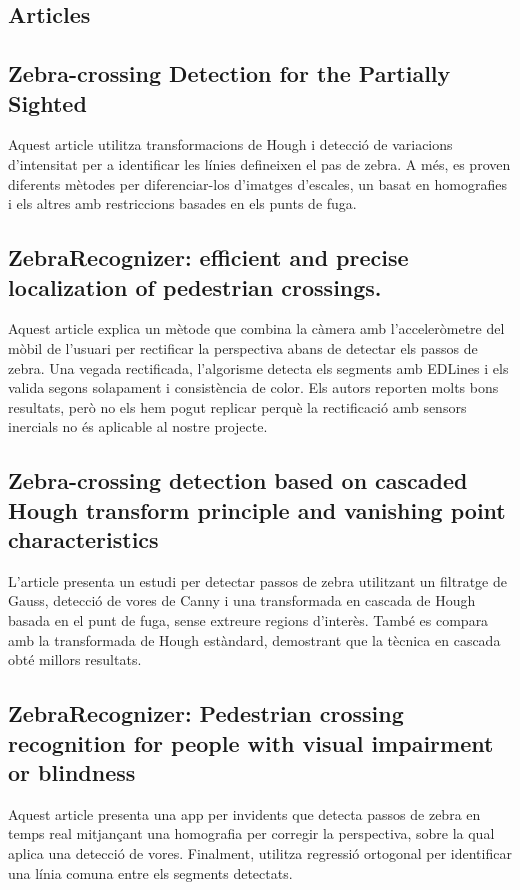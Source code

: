 \documentclass[10pt,a4paper,twocolumn,twoside]{article}
\begin{document}
\subsection{Articles}\label{sec:articles}
\subsection*{Zebra-crossing Detection for the Partially Sighted \cite{ZebraPartiallySighted}}
Aquest article utilitza transformacions de Hough i detecció de variacions d'intensitat per a identificar les línies defineixen el pas de zebra. A més, es proven diferents mètodes per diferenciar-los d'imatges d'escales, un basat en homografies i els altres amb restriccions basades en els punts de fuga.

\subsection*{ZebraRecognizer: efficient and precise localization of pedestrian crossings. \cite{ZebraRecognizer}}

Aquest article explica un mètode que combina la càmera amb l’acceleròmetre del mòbil de l'usuari per rectificar la perspectiva abans de detectar els passos de zebra. Una vegada rectificada, l’algorisme detecta els segments amb EDLines i els valida segons solapament i consistència de color. Els autors reporten molts bons resultats, però no els hem pogut replicar perquè la rectificació amb sensors inercials no és aplicable al nostre projecte.

\subsection*{Zebra-crossing detection based on cascaded Hough transform principle and vanishing point characteristics \cite{CascadedHough}}

L'article presenta un estudi per detectar passos de zebra utilitzant un filtratge de Gauss, detecció de vores de Canny i una transformada en cascada de Hough basada en el punt de fuga, sense extreure regions d'interès. També es compara amb la transformada de Hough estàndard, demostrant que la tècnica en cascada obté millors resultats.

\subsection*{ZebraRecognizer: Pedestrian crossing recognition for people with visual impairment or blindness \cite{RobustPedestrian}}
Aquest article presenta una app per invidents que detecta passos de zebra en temps real mitjançant una homografia per corregir la perspectiva, sobre la qual aplica una detecció de vores. Finalment, utilitza regressió ortogonal per identificar una línia comuna entre els segments detectats.
\end{document}
